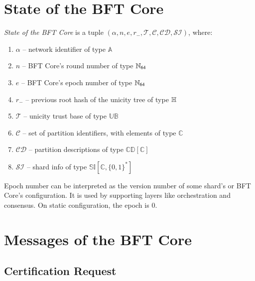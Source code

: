 \section{State of the BFT Core}

\emph{State of the BFT Core} is a tuple $(\alpha, n, e, r_-, \mathcal{T}, \mathcal{C}, \mathcal{CD}, \mathcal{SI})$, where:
\begin{enumerate}
	\item $\alpha$ -- network identifier of type $\mathbb{A}$
	\item $n$ -- BFT Core's round number of type $\mathbb{N}_{64}$
	\item $e$ -- BFT Core's epoch number of type $\mathbb{N}_{64}$
	\item $r_-$ -- previous root hash of the unicity tree of type $\mathbb{H}$
	\item $\mathcal{T}$ -- unicity trust base of type $\mathbb{UB}$
	\item $\mathcal{C}$ -- set of partition identifiers, with elements of type $\mathbb{C}$
	\item $\mathcal{CD}$ -- partition descriptions of type $\mathbb{CD}[\mathbb{C}]$
	\item $\mathcal{SI}$ -- shard info of type $\mathbb{SI}[\mathbb{C},\{0,1\}^\ast]$
\end{enumerate}

Epoch number can be interpreted as the version number of some shard's or BFT Core's configuration. It is used by supporting layers like orchestration and consensus. On static configuration, the epoch is $0$.



\section{Messages of the BFT Core}

\subsection{Certification Request}\label{certification-request}

